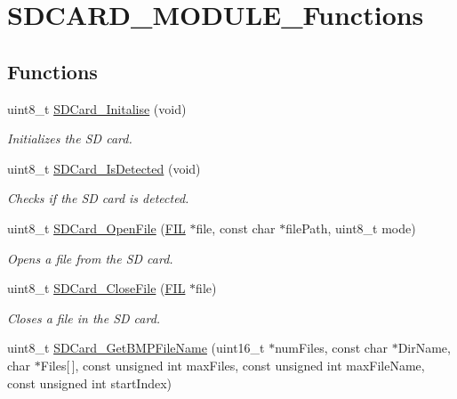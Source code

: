 \hypertarget{group___s_d_c_a_r_d___m_o_d_u_l_e___functions}{}\section{S\+D\+C\+A\+R\+D\+\_\+\+M\+O\+D\+U\+L\+E\+\_\+\+Functions}
\label{group___s_d_c_a_r_d___m_o_d_u_l_e___functions}
\subsection*{Functions}
\begin{DoxyCompactItemize}
\item 
uint8\+\_\+t \hyperlink{group___s_d_c_a_r_d___m_o_d_u_l_e___functions_ga67d24fe1c8fc3857820722e1f72350e0}{S\+D\+Card\+\_\+\+Initalise} (void)
\begin{DoxyCompactList}\small\item\em Initializes the SD card. \end{DoxyCompactList}\item 
uint8\+\_\+t \hyperlink{group___s_d_c_a_r_d___m_o_d_u_l_e___functions_ga67ae8af16e8ce41e6965c72bec56a547}{S\+D\+Card\+\_\+\+Is\+Detected} (void)
\begin{DoxyCompactList}\small\item\em Checks if the SD card is detected. \end{DoxyCompactList}\item 
uint8\+\_\+t \hyperlink{group___s_d_c_a_r_d___m_o_d_u_l_e___functions_ga6d13327e38d90e8a24fe691c3a8f11ac}{S\+D\+Card\+\_\+\+Open\+File} (\hyperlink{struct_f_i_l}{F\+IL} $\ast$file, const char $\ast$file\+Path, uint8\+\_\+t mode)
\begin{DoxyCompactList}\small\item\em Opens a file from the SD card. \end{DoxyCompactList}\item 
uint8\+\_\+t \hyperlink{group___s_d_c_a_r_d___m_o_d_u_l_e___functions_gabc2c13ff7f461c265d71cbafa5e1366f}{S\+D\+Card\+\_\+\+Close\+File} (\hyperlink{struct_f_i_l}{F\+IL} $\ast$file)
\begin{DoxyCompactList}\small\item\em Closes a file in the SD card. \end{DoxyCompactList}\item 
uint8\+\_\+t \hyperlink{group___s_d_c_a_r_d___m_o_d_u_l_e___functions_ga85066324178d7c7ca0de7182bbe9e603}{S\+D\+Card\+\_\+\+Get\+B\+M\+P\+File\+Name} (uint16\+\_\+t $\ast$num\+Files, const char $\ast$Dir\+Name, char $\ast$Files\mbox{[}$\,$\mbox{]}, const unsigned int max\+Files, const unsigned int max\+File\+Name, const unsigned int start\+Index)

\end{DoxyCompactItemize}
